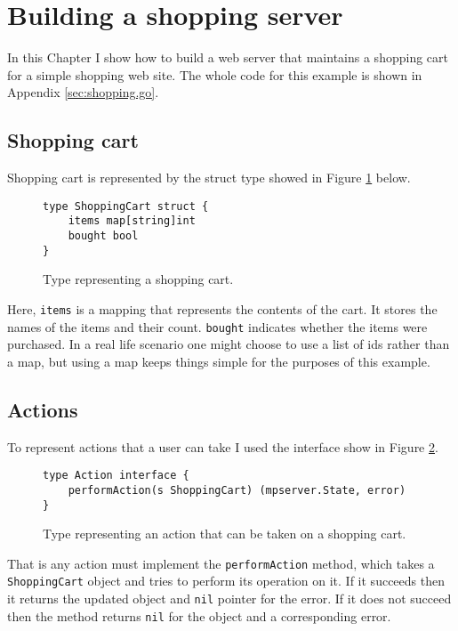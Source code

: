\section{Building a shopping server}
\label{sec:shopping}
In this Chapter I show how to build a web server that
maintains a shopping cart for a simple shopping web site. The whole 
code for this example is shown in Appendix \ref{sec:shopping.go}.

\subsection{Shopping cart}
Shopping cart is represented by the struct type showed in Figure 
\ref{fig:shoppingCart} below.
\begin{figure}[h]
\begin{lstlisting}
type ShoppingCart struct {
    items map[string]int
    bought bool
}
\end{lstlisting}
\caption[scale=1.0]{Type representing a shopping cart.}
\label{fig:shoppingCart}
\end{figure}

Here, \texttt{items} is 
a mapping that represents the contents of the cart. It stores the names
of the items and their count. \texttt{bought} indicates whether the items
were purchased. In a real life scenario one might choose to use 
a list of ids rather than a map, but using a map keeps things simple
for the purposes of this example.

\subsection{Actions}
To represent actions that a user can take I used the interface show in 
Figure \ref{fig:action}.
\begin{figure}[h]
\begin{lstlisting}
type Action interface {
    performAction(s ShoppingCart) (mpserver.State, error)
}
\end{lstlisting}
\caption[scale=1.0]{Type representing an action that can be taken on 
a shopping cart.}
\label{fig:action}
\end{figure}

That is any action must implement the \texttt{performAction} method, which takes
a \texttt{ShoppingCart} object and tries to perform its operation on it. If
it succeeds then it returns the updated object and \texttt{nil} pointer for the
error. If it does not succeed then the method returns \texttt{nil} for the
object and a corresponding error.

